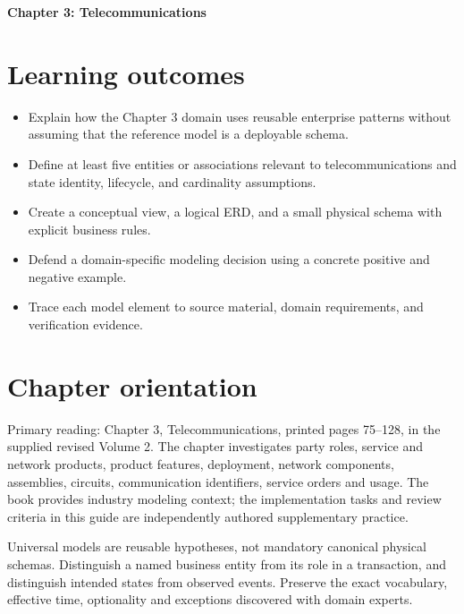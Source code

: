 \documentclass[11pt,letterpaper]{article}
\begin{document}
\begin{center}
{\LARGE\bfseries\color{navy} Chapter 3: Telecommunications}\par
\vspace{0.25em}{\large Study guide | concept, critique, design, verify}\par
{}
\end{center}
\vspace{0.8em}
\section{Learning outcomes}
\begin{itemize}
\item Explain how the Chapter 3 domain uses reusable enterprise patterns without assuming that the reference model is a deployable schema.
\item Define at least five entities or associations relevant to telecommunications and state identity, lifecycle, and cardinality assumptions.
\item Create a conceptual view, a logical ERD, and a small physical schema with explicit business rules.
\item Defend a domain-specific modeling decision using a concrete positive and negative example.
\item Trace each model element to source material, domain requirements, and verification evidence.
\end{itemize}

\section{Chapter orientation}
Primary reading: Chapter 3, Telecommunications, printed pages 75--128, in the supplied revised Volume 2. The chapter investigates party roles, service and network products, product features, deployment, network components, assemblies, circuits, communication identifiers, service orders and usage. The book provides industry modeling context; the implementation tasks and review criteria in this guide are independently authored supplementary practice.

Universal models are reusable hypotheses, not mandatory canonical physical schemas. Distinguish a named business entity from its role in a transaction, and distinguish intended states from observed events. Preserve the exact vocabulary, effective time, optionality and exceptions discovered with domain experts.
\end{document}
